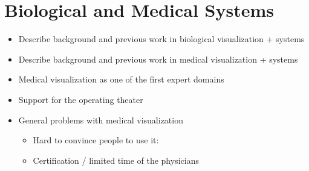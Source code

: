 \section{Biological and Medical Systems}
\label{contributions:medbio}
\begin{itemize}
\item Describe background and previous work in biological visualization + systems
\item Describe background and previous work in medical visualization + systems
\item Medical visualization as one of the first expert domains
\item Support for the operating theater
\item General problems with medical visualization
\begin{itemize}
    \item Hard to convince people to use it:
    \item Certification / limited time of the physicians
\end{itemize}
\end{itemize}

